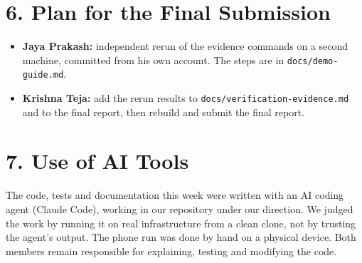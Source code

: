 \documentclass{article}
\begin{document}
\section*{6. Plan for the Final Submission}
\begin{itemize}
    \item \textbf{Jaya Prakash:} independent rerun of the evidence commands on a second machine, committed from his own account. The steps are in \texttt{docs/demo-guide.md}.
    \item \textbf{Krishna Teja:} add the rerun results to \texttt{docs/verification-evidence.md} and to the final report, then rebuild and submit the final report.
\end{itemize}

\section*{7. Use of AI Tools}
The code, tests and documentation this week were written with an AI coding agent (Claude Code), working in our repository under our direction. We judged the work by running it on real infrastructure from a clean clone, not by trusting the agent's output. The phone run was done by hand on a physical device. Both members remain responsible for explaining, testing and modifying the code.
\end{document}
